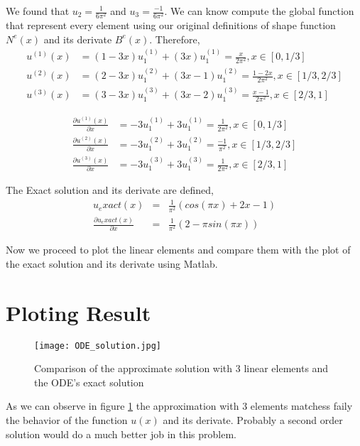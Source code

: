 \documentclass[a4paper]{memoir}
\begin{document}
We found that $u_2 = \frac{1}{6\pi^2}$ and $u_3 = \frac{-1}{6\pi^2}$. We can know compute the global function that represent every element using our original definitions of shape function $N^e(x)$ and its derivate $B^e(x)$. Therefore, 
\begin{align*}
	u^{(1)}(x) &= (1-3x) u_1^{(1)} + (3x) u_1^{(1)} = \frac{x}{2\pi^2}, x \in [0,1/3] \\
	u^{(2)}(x) &= (2-3x) u_1^{(2)} + (3x-1) u_1^{(2)} = \frac{1-2x}{2\pi^2}, x \in [1/3,2/3] \\
	u^{(3)}(x) &= (3-3x) u_1^{(3)} + (3x-2) u_1^{(3)} = \frac{x-1}{2\pi^2}, x \in [2/3,1]
\end{align*}

\begin{align*}
	\frac{\partial u^{(1)}(x)}{\partial x} &= -3 u_1^{(1)} + 3 u_1^{(1)} = \frac{1}{2\pi^2}, x \in [0,1/3] \\
	\frac{\partial u^{(2)}(x)}{\partial x} &= -3 u_1^{(2)} + 3 u_1^{(2)} = \frac{-1}{\pi^2}, x \in [1/3,2/3] \\
	\frac{\partial u^{(3)}(x)}{\partial x} &= -3 u_1^{(3)} + 3 u_1^{(3)} = \frac{1}{2\pi^2}, x \in [2/3,1]
\end{align*}

The Exact solution and its derivate are defined,
\begin{eqnarray}
u_exact(x) &=& \frac{1}{\pi^2}(cos(\pi x)+2x-1) \\
\frac{\partial u_exact(x)}{\partial x} &=& \frac{1}{\pi^2}(2-\pi sin(\pi x))
\end{eqnarray}

Now we proceed to plot the linear elements and compare them with the plot of the exact solution and its derivate using Matlab.

\section{Ploting Result}

\begin{figure}
	\centering
		\texttt{[image: ODE\_solution.jpg]}
	\caption{Comparison of the approximate solution with 3 linear elements and the ODE's exact solution}
	\label{fig:ODE_solution}
\end{figure}

As we can observe in figure \ref{fig:ODE_solution} the approximation with 3 elements matchess faily the behavior of the function $u(x)$ and its derivate. Probably a second order solution would do a much better job in this problem.
\end{document}
